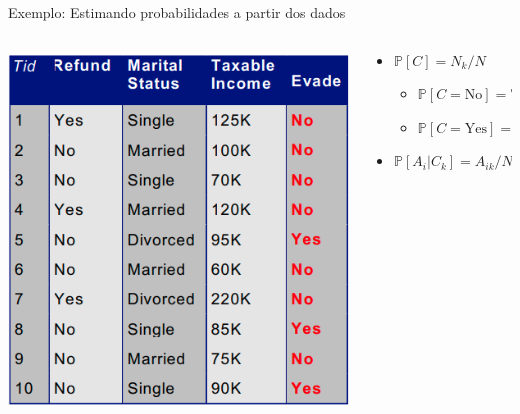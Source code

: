 \documentclass[ignorenonframetext,]{beamer}
\begin{document}
\begin{frame}{Exemplo: Estimando probabilidades a partir dos dados}
\protect\hypertarget{exemplo-estimando-probabilidades-a-partir-dos-dados}{}

\begin{columns}
 \begin{column}{.5\textwidth}
  \includegraphics[width=\linewidth]{naive_bayes-example.png}
 \end{column}
 \begin{column}{.5\textwidth}
  \begin{itemize}
   \item \(\mathbb{P}[C] = N_{k} / N\)

    \begin{itemize}
     \item \(\mathbb{P}[C = \text{No}] = 7 / 10\)
     \item \(\mathbb{P}[C = \text{Yes}] = 3 / 10\)
    \end{itemize}
  \end{itemize}


  \begin{itemize}
   \item \(\mathbb{P}[A_{i} | C_{k}] = A_{ik} / N_{k}\)


\end{itemize}
\end{column}
\end{columns}
\end{frame}
\end{document}
